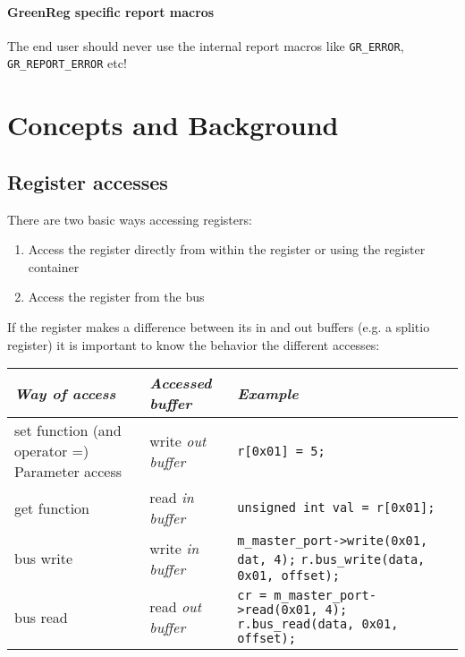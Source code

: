 \paragraph{GreenReg specific report macros}
The end user should never use the internal \GreenReg report macros like \lstinline|GR_ERROR|, \lstinline|GR_REPORT_ERROR| etc!





\section{Concepts and Background}
\label{sec:ConceptsAndBackground}



\subsection{Register accesses}

There are two basic \GreenReg ways accessing registers:
\begin{enumerate}
	\item Access the register directly from within the register or using the register container
	\item Access the register from the bus
\end{enumerate}
If the register makes a difference between its in and out buffers (e.g. a splitio register) it is important to know the behavior the different accesses:

\noindent
\begin{tabular}[z]{|p{4cm}|p{5cm}|p{7cm}|}
	\hline
	\textsl{Way of access} & \textsl{Accessed buffer} & \textsl{Example} \\ 
	\hline
	\hline
	set function \newline(and operator =) \newline Parameter access & write {\em out buffer} & \lstinline|r[0x01] = 5;| \\
	\hline
	get function & read {\em in buffer} & \lstinline|unsigned int val = r[0x01];|\\
	\hline
	bus write & write {\em in buffer} & \lstinline|m_master_port->write(0x01, dat, 4);| \newline \lstinline|r.bus_write(data, 0x01, offset);| \\
	\hline
	bus read & read {\em out buffer} & \lstinline|cr = m_master_port->read(0x01, 4);| \newline \lstinline|r.bus_read(data, 0x01, offset);|\\
	\hline
\end{tabular}

